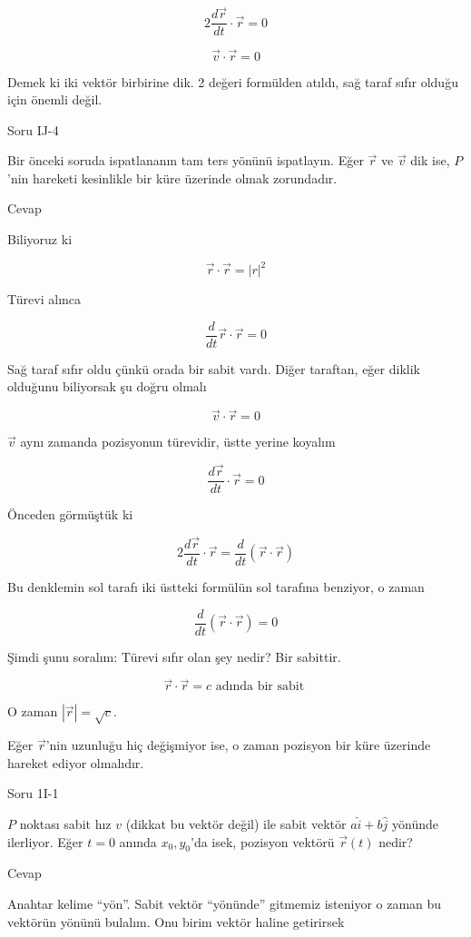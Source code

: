 \documentclass[12pt,fleqn]{article}\usepackage{../../common}
\begin{document}
$$ 
2 \frac{d\vec{r}}{dt} \cdot \vec{r} = 0
$$

$$ \vec{v} \cdot \vec{r} = 0 $$

Demek ki iki vektör birbirine dik. 2 değeri formülden atıldı, sağ taraf
sıfır olduğu için önemli değil.

Soru IJ-4

Bir önceki soruda ispatlananın tam ters yönünü ispatlayın. Eğer $\vec{r}$
ve $\vec{v}$ dik ise, $P$'nin hareketi kesinlikle bir küre üzerinde olmak
zorundadır. 

Cevap

Biliyoruz ki

$$ \vec{r} \cdot \vec{r} = |r|^2 $$

Türevi alınca

$$ 
\frac{d}{dt}\vec{r} \cdot \vec{r} = 0 
 $$

Sağ taraf sıfır oldu çünkü orada bir sabit vardı. Diğer taraftan, eğer
diklik olduğunu biliyorsak şu doğru olmalı

$$ \vec{v} \cdot \vec{r} = 0 $$

$\vec{v}$ aynı zamanda pozisyonun türevidir, üstte yerine koyalım

$$ 
\frac{d\vec{r}}{dt} \cdot \vec{r} = 0
$$

Önceden görmüştük ki 

$$ 
2 \frac{d\vec{r}}{dt} \cdot \vec{r} =
\frac{d}{dt}(\vec{r} \cdot \vec{r})   
 $$

Bu denklemin sol tarafı iki üstteki formülün sol tarafına benziyor, o zaman

$$ \frac{d}{dt}(\vec{r} \cdot \vec{r}) = 0 $$

Şimdi şunu soralım: Türevi sıfır olan şey nedir? Bir sabittir. 

$$ \vec{r} \cdot \vec{r} = c \textrm{ adında bir sabit }$$

O zaman $|\vec{r}| = \sqrt{c}$. 

Eğer $\vec{r}$'nin uzunluğu hiç değişmiyor ise, o zaman pozisyon bir küre
üzerinde hareket ediyor olmalıdır.

Soru 1I-1

$P$ noktası sabit hız $v$ (dikkat bu vektör değil) ile sabit vektör
$a\hat{i}+b\hat{j}$ yönünde ilerliyor. Eğer $t=0$ anında $x_0,y_0$'da isek,
pozisyon vektörü $\vec{r}(t)$ nedir?

Cevap

Anahtar kelime ``yön''. Sabit vektör ``yönünde'' gitmemiz isteniyor o zaman
bu vektörün yönünü bulalım. Onu birim vektör haline getirirsek 
\end{document}
